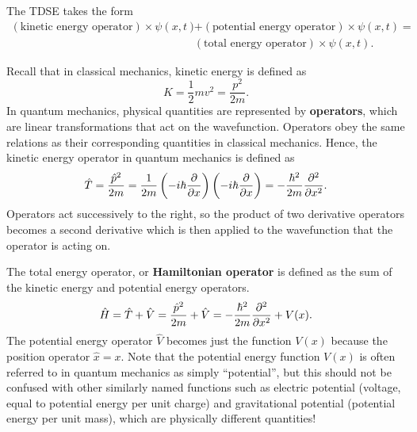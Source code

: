 \documentclass[../quantum_mechanics.tex]{subfiles}
\begin{document}
            The TDSE takes the form
            \begin{equation}
                \begin{split}
                    (\text{kinetic energy operator})\times\psi(x,t)&+(\text{potential energy operator})\times\psi(x,t)=\\
                    &(\text{total energy operator})\times\psi(x,t).    
                \end{split}
            \end{equation}

            Recall that in classical mechanics, kinetic energy is defined as
            \begin{equation}
                K=\frac{1}{2}mv^2=\frac{p^2}{2m}.
            \end{equation}
            In quantum mechanics, physical quantities are represented by \textbf{operators}, which are linear transformations that act on the wavefunction.
            Operators obey the same relations as their corresponding quantities in classical mechanics.
            Hence, the kinetic energy operator in quantum mechanics is defined as
            \begin{equation}\label{eq:operator-kinetic-energy}
                \hat{T}=\frac{\hat{p}^2}{2m}=\frac{1}{2m}\left(-i\hbar\pdv{}{x}\right)\left(-i\hbar\pdv{}{x}\right)=-\frac{\hbar^2}{2m}\pdv[2]{}{x}.
            \end{equation}
            Operators act successively to the right, so the product of two derivative operators becomes a second derivative which is then applied to the wavefunction that the operator is acting on.
            
            The total energy operator, or \textbf{Hamiltonian operator} is defined as the sum of the kinetic energy and potential energy operators.
            \begin{equation}
                \hat{H}=\hat{T}+\hat{V}=\frac{\hat{p}^2}{2m}+\hat{V}=-\frac{\hbar^2}{2m}\pdv[2]{}{x}+V(x).
            \end{equation}
            The potential energy operator $\hat{V}$ becomes just the function $V(x)$ because the position operator $\hat{x}=x$.
            Note that the potential energy function $V(x)$ is often referred to in quantum mechanics as simply ``potential'', but this should not be confused with other similarly named functions such as electric potential (voltage, equal to potential energy per unit charge) and gravitational potential (potential energy per unit mass), which are physically different quantities!
            
\end{document}
